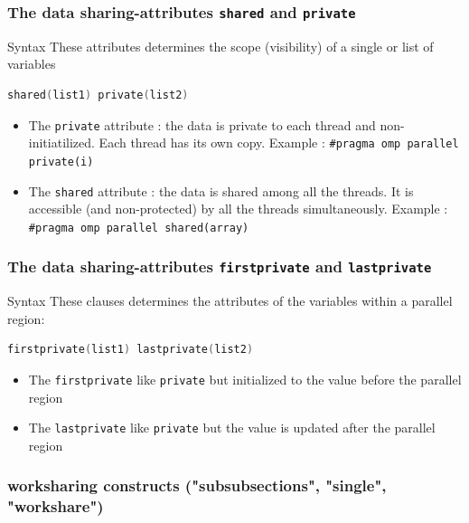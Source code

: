\begin{frame}[fragile]
  \frametitle{The data sharing-attributes \texttt{shared} and \texttt{private}}
  \begin{exampleblock}{Syntax}
These attributes determines the scope (visibility) of a single or list of variables
\begin{lstlisting}[language=C,frame=lines]
shared(list1) private(list2)
\end{lstlisting}

\begin{itemize}
\item{The \verb+private+ attribute : the data is private to each thread and non-initiatilized. Each thread has its own copy. Example : \verb+#pragma omp parallel private(i)+}
\item{The \verb+shared+ attribute : the data is shared among all the threads. It is accessible (and non-protected) by all the threads simultaneously. Example : \verb+#pragma omp parallel shared(array)+}
\end{itemize}

\end{exampleblock}

\end{frame}



\begin{frame}[containsverbatim]
\frametitle{The data sharing-attributes \texttt{firstprivate} and \texttt{lastprivate}}
\begin{exampleblock}{Syntax}
These clauses determines the attributes of the variables within a parallel region:
\begin{lstlisting}[language=C,frame=lines]
firstprivate(list1) lastprivate(list2)
\end{lstlisting}
\begin{itemize}
\item{The \texttt{firstprivate} like {\tt private} but initialized to the value before the parallel region}
\item{The \texttt{lastprivate}  like {\tt private} but the value is updated after the parallel region}
\end{itemize}
\end{exampleblock}
\end{frame}




\subsubsection[Worksharing constructs]{worksharing constructs ("subsubsections", "single", "workshare")}



